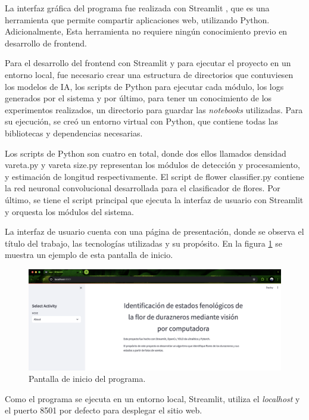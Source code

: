 La interfaz gráfica del programa fue realizada con Streamlit \cite{WEBSITE:11}, que es una herramienta que permite compartir aplicaciones web, utilizando Python. Adicionalmente, Esta herramienta no requiere ningún conocimiento previo en desarrollo de frontend. 

Para el desarrollo del frontend con Streamlit y para ejecutar el proyecto en un entorno local, fue necesario crear una estructura de directorios que contuviesen los modelos de IA, los scripts de Python para ejecutar cada módulo, los logs generados por el sistema y por último, para tener un conocimiento de los experimentos realizados, un directorio para guardar las \textit{notebooks} utilizadas. Para su ejecución, se creó un entorno virtual con Python, que contiene todas las bibliotecas y dependencias necesarias.

Los scripts de Python son cuatro en total, donde dos ellos llamados densidad vareta.py y vareta size.py representan los módulos de detección y procesamiento, y estimación de longitud respectivamente. El script de flower classifier.py contiene la red neuronal convolucional desarrollada para el clasificador de flores. Por último, se tiene el script principal que ejecuta la interfaz de usuario con Streamlit y orquesta los módulos del sistema.

La interfaz de usuario cuenta con una página de presentación, donde se observa el título del trabajo, las tecnologías utilizadas y su propósito. En la figura \ref{fig:pantallaInicio} se muestra un ejemplo de esta pantalla de inicio.

\begin{figure}[ht]
	\centering
	\includegraphics[scale=0.13]{./Figures/pantallaInicio.png}
	\caption{Pantalla de inicio del programa.}
	\label{fig:pantallaInicio}
\end{figure}

Como el programa se ejecuta en un entorno local, Streamlit, utiliza el \textit{localhost} y el puerto 8501 por defecto para desplegar el sitio web.

